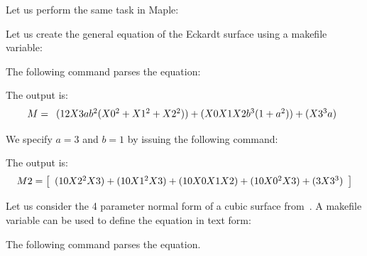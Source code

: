 \bigskip


Let us perform the same task in Maple:



\bigskip





Let us create the general equation 
of the Eckardt surface using a makefile variable:



The following command parses the equation:




The output is:
$$
M = 
\begin{array}{*{1}c}
(12 X3 a b^{2} (X0^{2} + X1^{2} + X2^{2})) + (X0 X1 X2 b^{3} (1 + a^{2})) + (X3^{3} a)\\
\end{array}
$$

We specify $a=3$ and $b=1$ by issuing the following command:


The output is:
$$
M2 = 
\left[
\begin{array}{*{1}c}
(10 X2^{2} X3) + (10 X1^{2} X3) + (10 X0 X1 X2) + (10 X0^{2} X3) + (3 X3^{3})\\
\end{array}
\right]
$$


\bigskip


Let us consider the 4 parameter normal form 
of a cubic surface from~\cite{BettenKaraoglu2022}.
A makefile variable can be used to define the equation in text form:


The following command parses the equation.


